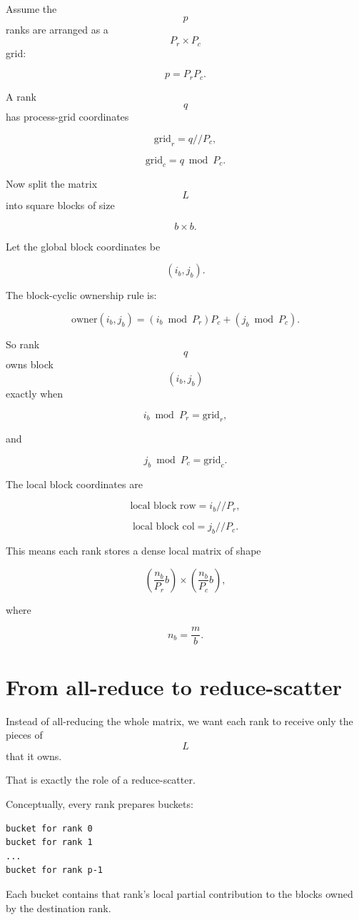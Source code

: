 \documentclass[11pt]{article}
\begin{document}
Assume the $$p$$ ranks are arranged as a $$P_r \times P_c$$ grid:

$$
p = P_rP_c.
$$

A rank $$q$$ has process-grid coordinates

$$
\text{grid}_r = q \mathbin{//} P_c,
$$

$$
\text{grid}_c = q \bmod P_c.
$$

Now split the matrix $$L$$ into square blocks of size

$$
b \times b.
$$

Let the global block coordinates be

$$
(i_b, j_b).
$$

The block-cyclic ownership rule is:

$$
\text{owner}(i_b, j_b)
=
(i_b \bmod P_r)P_c
+
(j_b \bmod P_c).
$$

So rank $$q$$ owns block $$(i_b,j_b)$$ exactly when

$$
i_b \bmod P_r = \text{grid}_r,
$$

and

$$
j_b \bmod P_c = \text{grid}_c.
$$

The local block coordinates are

$$
\text{local block row} = i_b \mathbin{//} P_r,
$$

$$
\text{local block col} = j_b \mathbin{//} P_c.
$$

This means each rank stores a dense local matrix of shape

$$
\left(\frac{n_b}{P_r}b\right)
\times
\left(\frac{n_b}{P_c}b\right),
$$

where

$$
n_b = \frac{m}{b}.
$$

\section{From all-reduce to reduce-scatter}

Instead of all-reducing the whole matrix, we want each rank to receive only the pieces of $$L$$ that it owns.

That is exactly the role of a reduce-scatter.

Conceptually, every rank prepares buckets:

\begin{lstlisting}
bucket for rank 0
bucket for rank 1
...
bucket for rank p-1
\end{lstlisting}

Each bucket contains that rank's local partial contribution to the blocks owned by the destination rank.
\end{document}

